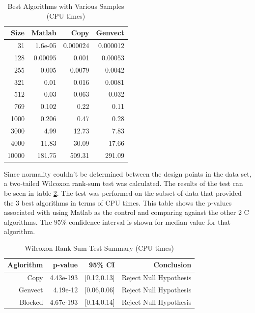 \documentclass[sigconf]{acmart}
\begin{document}
\begin{table}
  \caption{Best Algorithms with Various Samples (CPU times)}
  \label{tab:times}
  \begin{tabular}{rrrr}
    \toprule
    Size&Matlab&Copy&Genvect\\
    \midrule
    31    & 1.6e-05     & 0.000024    & 0.000012 \\
    128   & 0.00095     & 0.001       & 0.00053 \\
    255   & 0.005       & 0.0079      & 0.0042 \\
    321   & 0.01        & 0.016       & 0.0081 \\
    512   & 0.03        & 0.063       & 0.032 \\
    769   & 0.102       & 0.22        & 0.11 \\
    1000  & 0.206       & 0.47        & 0.28 \\
    3000  & 4.99        & 12.73       & 7.83 \\
    4000  & 11.83       & 30.09       & 17.66 \\
    10000 & 181.75      & 509.31      & 291.09 \\
  \bottomrule
\end{tabular}
\end{table}

Since normality couldn't be determined between the design points in the data set, a two-tailed Wilcoxon rank-sum test was calculated. The results of the test can be seen in table \ref{tab:wilcoxon}. The test was performed on the subset of data that provided the 3 best algorithms in terms of CPU times. This table shows the p-values associated with using Matlab as the control and comparing against the other 2 C algorithms. The ${95\%}$ confidence interval is shown for median value for that algorithm.

\begin{table}
  \caption{Wilcoxon Rank-Sum Test Summary (CPU times)}
  \label{tab:wilcoxon}
  \begin{tabular}{rrrr}
    \toprule
    Aglorithm&p-value&95\% CI&Conclusion\\
    \midrule
    Copy & 4.43e-193 & [0.12,0.13] & Reject Null Hypothesis\\
    Genvect & 4.19e-12 & [0.06,0.06] & Reject Null Hypothesis\\
    Blocked & 4.67e-193 & [0.14,0.14] & Reject Null Hypothesis\\
  \bottomrule
\end{tabular}
\end{table}
\end{document}
